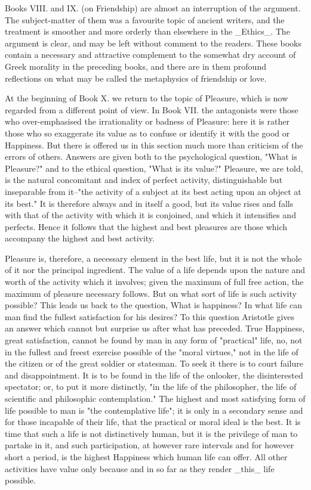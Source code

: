 Books VIII. and IX. (on Friendship) are almost an interruption of the
argument. The subject-matter of them was a favourite topic of ancient
writers, and the treatment is smoother and more orderly than elsewhere
in the _Ethics_. The argument is clear, and may be left without
comment to the readers. These books contain a necessary and attractive
complement to the somewhat dry account of Greek morality in the
preceding books, and there are in them profound reflections on what may
be called the metaphysics of friendship or love.

At the beginning of Book X. we return to the topic of Pleasure, which
is now regarded from a different point of view. In Book VII. the
antagonists were those who over-emphasised the irrationality or badness
of Pleasure: here it is rather those who so exaggerate its value as to
confuse or identify it with the good or Happiness. But there is offered
us in this section much more than criticism of the errors of others.
Answers are given both to the psychological question, "What is
Pleasure?" and to the ethical question, "What is its value?" Pleasure,
we are told, is the natural concomitant and index of perfect activity,
distinguishable but inseparable from it--"the activity of a subject at
its best acting upon an object at its best." It is therefore always
and in itself a good, but its value rises and falls with that of the
activity with which it is conjoined, and which it intensifies and
perfects. Hence it follows that the highest and best pleasures are those
which accompany the highest and best activity.

Pleasure is, therefore, a necessary element in the best life, but it is
not the whole of it nor the principal ingredient. The value of a life
depends upon the nature and worth of the activity which it involves;
given the maximum of full free action, the maximum of pleasure necessary
follows. But on what sort of life is such activity possible? This leads
us back to the question, What is happiness? In what life can man find
the fullest satisfaction for his desires? To this question Aristotle
gives an answer which cannot but surprise us after what has preceded.
True Happiness, great satisfaction, cannot be found by man in any form
of "practical" life, no, not in the fullest and freest exercise possible
of the "moral virtues," not in the life of the citizen or of the
great soldier or statesman. To seek it there is to court failure and
disappointment. It is to be found in the life of the onlooker, the
disinterested spectator; or, to put it more distinctly, "in the life of
the philosopher, the life of scientific and philosophic contemplation."
The highest and most satisfying form of life possible to man is "the
contemplative life"; it is only in a secondary sense and for those
incapable of their life, that the practical or moral ideal is the best.
It is time that such a life is not distinctively human, but it is the
privilege of man to partake in it, and such participation, at however
rare intervals and for however short a period, is the highest Happiness
which human life can offer. All other activities have value only because
and in so far as they render _this_ life possible.

